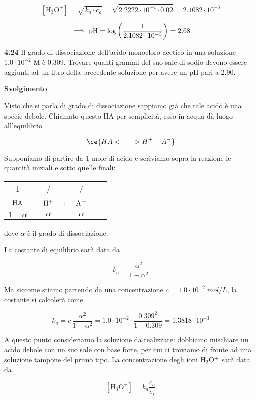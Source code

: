 $$[\text{H}_3\text{O}^+] = \sqrt{k_a \cdot c_a}
=\sqrt{2.2222 \cdot 10^{-4} \cdot 0.02}=2.1082 \cdot 10^{-3}$$

$$\implies \rm pH=\log{\left(\frac{1}{2.1082 \cdot 10^{-3}}\right)}=2.68$$

\vspace{0.2cm}\textbf{4.24} Il grado di dissociazione dell'acido monocloro acetico in una soluzione $1.0 \cdot 10^{-2}$ M è 0.309. Trovare quanti grammi del suo sale di sodio devono essere aggiunti ad un litro della precedente soluzione per avere un pH pari a 2.90.

\vspace{0.2cm}\large\textbf{Svolgimento}\normalsize

\vspace{0.2cm}Visto che si parla di grado di dissociazione sappiamo già che tale acido è una specie debole. Chiamato questo HA per semplicità, esso in acqua dà luogo all'equilibrio

$$\ce{HA <--> H^+ + A^-}$$

Supponiamo di partire da 1 mole di acido e scriviamo sopra la reazione le quantità iniziali e sotto quelle finali:

\begin{center}
    \begin{tabular}{ccccccc}
        1 & & / & & /\\
        $\rm HA$ & \ce{<-->} & $\rm H^+$ & + & $\rm A^-$\\
        $1- \alpha$ & & $\alpha$ & & $\alpha$\\
    \end{tabular}
\end{center}

dove $\alpha$ è il grado di dissociazione.

La costante di equilibrio sarà data da

$$k_a=\frac{\alpha^2}{1-\alpha^2}$$

Ma siccome stiamo partendo da una concentrazione $c=1.0 \cdot 10^{-2}\;mol/L$, la costante si calcolerà come

$$k_a=c\,\frac{\alpha^2}{1-\alpha^2}
=1.0 \cdot 10^{-2} \cdot \frac{0.309^2}{1-0.309}
=1.3818 \cdot 10^{-3}$$

A questo punto consideriamo la soluzione da realizzare: dobbiamo mischiare un acido debole con un suo sale con base forte, per cui ci troviamo di fronte ad una soluzione tampone del primo tipo. La concentrazione degli ioni $\rm H_3O^+$ sarà data da

$$[\text{H}_3\text{O}^+] = k_a \frac{c_a}{c_s}$$

